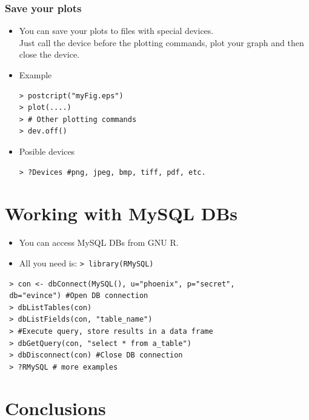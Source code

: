\documentclass{beamer}
\begin{document}
\begin{frame}[fragile]
 \frametitle{Save your plots}
 \begin{itemize}
  \item You can save your plots to files with special devices.\\
 Just call the device before the plotting commands,
 plot your graph and then close the device.
  \item Example
  \begin{verbatim}
> postcript("myFig.eps")
> plot(....)
> # Other plotting commands
> dev.off()
  \end{verbatim}
  \vspace{-0.5cm}
  \item Posible devices
  \begin{verbatim}
> ?Devices #png, jpeg, bmp, tiff, pdf, etc.
  \end{verbatim}
 \end{itemize}
\end{frame}


\section{Working with MySQL DBs}

\begin{frame}[fragile]

\begin{itemize}
 \item You can access MySQL DBs from GNU R.
 \item All you need is: \texttt{> library(RMySQL)}
\end{itemize}
\vspace{-0.5cm}
\begin{verbatim}
 > con <- dbConnect(MySQL(), u="phoenix", p="secret",
 db="evince") #Open DB connection
 > dbListTables(con)
 > dbListFields(con, "table_name")
 > #Execute query, store results in a data frame
 > dbGetQuery(con, "select * from a_table") 
 > dbDisconnect(con) #Close DB connection
 > ?RMySQL # more examples
\end{verbatim}

\end{frame}


\section{Conclusions}
\end{document}
